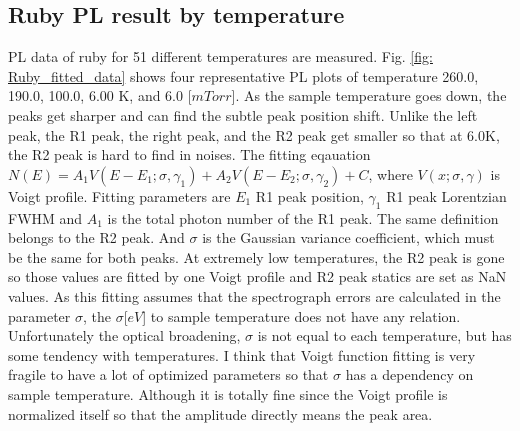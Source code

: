 \documentclass{article}
\begin{document}
\subsection{Ruby PL result by temperature}
\label{result:temperature_peak_statics}  
 PL data of ruby for 51 different temperatures are measured.
 Fig. \ref{fig: Ruby_fitted_data} shows four representative PL plots of temperature 260.0, 190.0, 100.0, 6.00 K, and 6.0 [$mTorr$].
 As the sample temperature goes down, the peaks get sharper and can find the subtle peak position shift.
 Unlike the left peak, the R1 peak, the right peak, and the R2 peak get smaller so that at 6.0K, the R2 peak is hard to find in noises.
 The fitting eqauation $N(E)=A_1 V(E-E_1;\sigma,\gamma_1) + A_2 V(E-E_2;\sigma,\gamma_2)+C$, where $V(x;\sigma,\gamma)$ is Voigt profile.
 Fitting parameters are $E_1$ R1 peak position, $\gamma_1$ R1 peak Lorentzian FWHM and $A_1$ is the total photon number of the R1 peak.
 The same definition belongs to the R2 peak.
 And $\sigma$ is the Gaussian variance coefficient, which must be the same for both peaks.
 At extremely low temperatures, the R2 peak is gone so those values are fitted by one Voigt profile and R2 peak statics are set as NaN values.
 As this fitting assumes that the spectrograph errors are calculated in the parameter $\sigma$, the $\sigma $[$eV$] to sample temperature does not have any relation.
 Unfortunately the optical broadening, $\sigma$ is not equal to each temperature, but has some tendency with temperatures.
 I think that Voigt function fitting is very fragile to have a lot of optimized parameters so that $\sigma$ has a dependency on sample temperature.
 Although it is totally fine since the Voigt profile is normalized itself so that the amplitude directly means the peak area.
\end{document}
